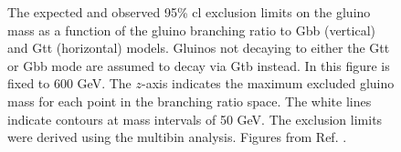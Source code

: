 \begin{figure}[htbp]
  \centering 
  \caption{The  expected and  observed 95\% \gls{cl} exclusion limits on the gluino mass as a function of the gluino branching ratio to Gbb (vertical) and Gtt (horizontal) models. Gluinos not decaying to either the Gtt or Gbb mode are assumed to decay via Gtb instead. In this figure \mchi is fixed to 600 GeV. The $z$-axis indicates the maximum excluded gluino mass for each point in the branching ratio space. The white lines indicate contours at mass intervals of 50 GeV. The exclusion limits were derived using the multibin analysis.
  Figures from Ref. \cite{ATLAS-CONF-2018-041}.
      }
  \label{fig:limits_triangle_600}
\end{figure}

